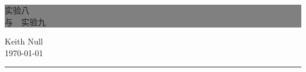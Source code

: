 \begin{titlepage} %


    \colorbox{grey}{
        \parbox[t]{0.93\textwidth}{ %
            \parbox[t]{0.91\textwidth}{ %
                \raggedleft %
                \fontsize{50pt}{80pt}\selectfont %
                \vspace{0.7cm} %

                  实验八 \\
                  与\ \ 实验九 \\


                \vspace{0.7cm} %
            }
        }
    }

    \vfill %


    \parbox[t]{0.93\textwidth}{ %
        \raggedleft %
        \large %
        {\Large Keith Null}\\[4pt] %
        \today\\

        \hfill\rule{0.2\linewidth}{1pt}%
    }

\end{titlepage}



